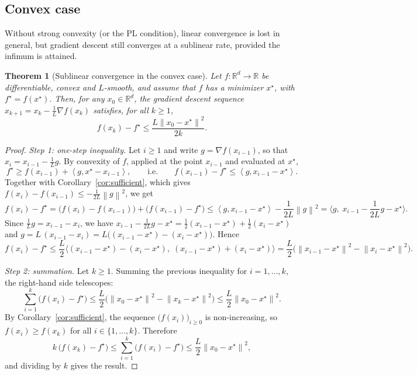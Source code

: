 \documentclass[11pt,a4paper]{article}
\newtheorem{theorem}{Theorem}
\theoremstyle{definition}
\theoremstyle{remark}
\newcommand{\R}{\mathbb{R}}
\newcommand{\norm}[1]{\left\lVert #1 \right\rVert}
\newcommand{\ip}[2]{\left\langle #1, #2 \right\rangle}
\begin{document}
\subsection{Convex case}\label{sec:convex}

Without strong convexity (or the PL condition), linear convergence is lost in general, but gradient descent still converges at a sublinear rate, provided the infimum is attained.

\begin{theorem}[Sublinear convergence in the convex case]\label{thm:convex}
Let $f : \R^d \to \R$ be differentiable, convex and $L$-smooth, and assume that $f$ has a minimizer $x^\star$, with $f^\star = f(x^\star)$. Then, for any $x_0 \in \R^d$, the gradient descent sequence $x_{k+1} = x_k - \frac1L \nabla f(x_k)$ satisfies, for all $k \ge 1$,
\[
f(x_k) - f^\star \le \frac{L \norm{x_0 - x^\star}^2}{2k} .
\]
\end{theorem}

\begin{proof}
\emph{Step 1: one-step inequality.} Let $i \ge 1$ and write $g = \nabla f(x_{i-1})$, so that $x_i = x_{i-1} - \frac1L g$. By convexity of $f$, applied at the point $x_{i-1}$ and evaluated at $x^\star$,
\[
f^\star \ge f(x_{i-1}) + \ip{g}{x^\star - x_{i-1}}, \qquad\text{i.e.}\qquad f(x_{i-1}) - f^\star \le \ip{g}{x_{i-1} - x^\star}.
\]
Together with Corollary~\ref{cor:sufficient}, which gives $f(x_i) - f(x_{i-1}) \le -\frac{1}{2L}\norm{g}^2$, we get
\[
f(x_i) - f^\star = \big(f(x_i) - f(x_{i-1})\big) + \big(f(x_{i-1}) - f^\star\big)
\le \ip{g}{x_{i-1} - x^\star} - \frac{1}{2L}\norm{g}^2
= \Big\langle g,\; x_{i-1} - \frac{1}{2L} g - x^\star \Big\rangle .
\]
Since $\frac1L g = x_{i-1} - x_i$, we have $x_{i-1} - \frac{1}{2L}g - x^\star = \frac12 (x_{i-1} - x^\star) + \frac12 (x_i - x^\star)$ and $g = L\,(x_{i-1} - x_i) = L\big((x_{i-1} - x^\star) - (x_i - x^\star)\big)$. Hence
\[
f(x_i) - f^\star \le \frac{L}{2}\Big\langle (x_{i-1} - x^\star) - (x_i - x^\star),\; (x_{i-1} - x^\star) + (x_i - x^\star) \Big\rangle
= \frac{L}{2}\Big(\norm{x_{i-1} - x^\star}^2 - \norm{x_i - x^\star}^2\Big).
\]

\emph{Step 2: summation.} Let $k \ge 1$. Summing the previous inequality for $i = 1, \dots, k$, the right-hand side telescopes:
\[
\sum_{i=1}^{k} \big(f(x_i) - f^\star\big) \le \frac{L}{2}\Big(\norm{x_0 - x^\star}^2 - \norm{x_k - x^\star}^2\Big) \le \frac{L}{2}\norm{x_0 - x^\star}^2 .
\]
By Corollary~\ref{cor:sufficient}, the sequence $\big(f(x_i)\big)_{i \ge 0}$ is non-increasing, so $f(x_i) \ge f(x_k)$ for all $i \in \{1, \dots, k\}$. Therefore
\[
k\,\big(f(x_k) - f^\star\big) \le \sum_{i=1}^{k} \big(f(x_i) - f^\star\big) \le \frac{L}{2}\norm{x_0 - x^\star}^2 ,
\]
and dividing by $k$ gives the result.
\end{proof}
\end{document}
